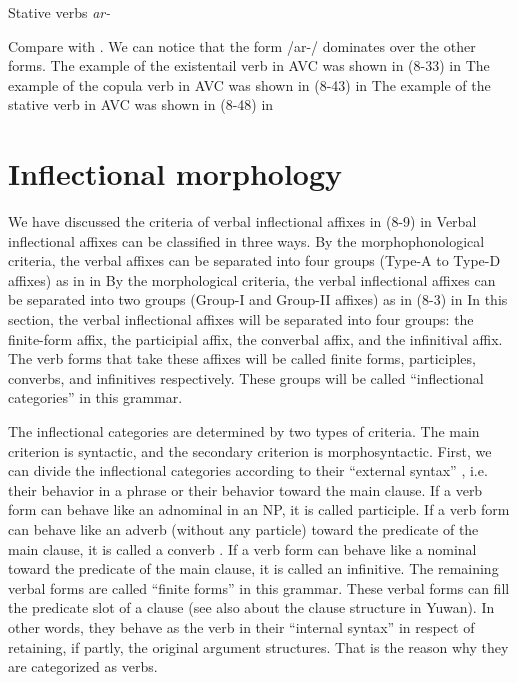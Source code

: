 Stative verbs  \textit{ar-}

Compare  with . We can notice that the form /ar-/ dominates over the other forms. The example of the existentail verb in AVC was shown in (8-33) in  The example of the copula verb in AVC was shown in (8-43) in  The example of the stative verb in AVC was shown in (8-48) in 

\section{Inflectional morphology}

We have discussed the criteria of verbal inflectional affixes in (8-9) in  Verbal inflectional affixes can be classified in three ways. By the morphophonological criteria, the verbal affixes can be separated into four groups (Type-A to Type-D affixes) as in  in  By the morphological criteria, the verbal inflectional affixes can be separated into two groups (Group-I and Group-II affixes) as in (8-3) in  In this section, the verbal inflectional affixes will be separated into four groups: the finite-form affix, the participial affix, the converbal affix, and the infinitival affix. The verb forms that take these affixes will be called finite forms, participles, converbs, and infinitives respectively. These groups will be called “inflectional categories” in this grammar.

  The inflectional categories are determined by two types of criteria. The main criterion is syntactic, and the secondary criterion is morphosyntactic. First, we can divide the inflectional categories according to their “external syntax” \citep{Haspelmath1996}, i.e. their behavior in a phrase or their behavior toward the main clause. If a verb form can behave like an adnominal in an NP, it is called participle. If a verb form can behave like an adverb (without any particle) toward the predicate of the main clause, it is called a converb \citep{Haspelmath1995}. If a verb form can behave like a nominal toward the predicate of the main clause, it is called an infinitive. The remaining verbal forms are called “finite forms” in this grammar. These verbal forms can fill the predicate slot of a clause (see also  about the clause structure in Yuwan). In other words, they behave as the verb in their “internal syntax” \citep{Haspelmath1996} in respect of retaining, if partly, the original argument structures. That is the reason why they are categorized as verbs.

